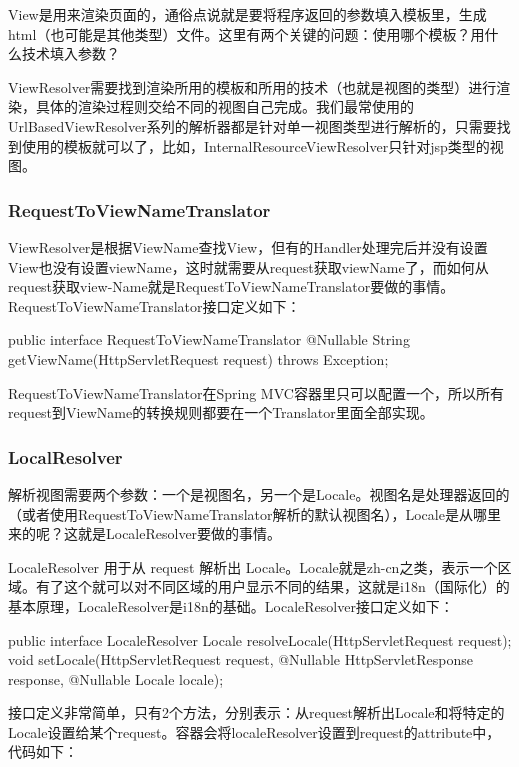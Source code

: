 View是用来渲染页面的，通俗点说就是要将程序返回的参数填入模板里，生成html（也可能是其他类型）文件。这里有两个关键的问题：使用哪个模板？用什么技术填入参数？

ViewResolver需要找到渲染所用的模板和所用的技术（也就是视图的类型）进行渲染，具体的渲染过程则交给不同的视图自己完成。我们最常使用的UrlBasedViewResolver系列的解析器都是针对单一视图类型进行解析的，只需要找到使用的模板就可以了，比如，InternalResourceViewResolver只针对jsp类型的视图。

\subsubsection*{RequestToViewNameTranslator}

ViewResolver是根据ViewName查找View，但有的Handler处理完后并没有设置View也没有设置viewName，这时就需要从request获取viewName了，而如何从request获取view-Name就是RequestToViewNameTranslator要做的事情。RequestToViewNameTranslator接口定义如下：

\begin{Java}
public interface RequestToViewNameTranslator {
	@Nullable
	String getViewName(HttpServletRequest request) throws Exception;
}
\end{Java}

RequestToViewNameTranslator在Spring MVC容器里只可以配置一个，所以所有request到ViewName的转换规则都要在一个Translator里面全部实现。

\subsubsection*{LocalResolver}

解析视图需要两个参数：一个是视图名，另一个是Locale。视图名是处理器返回的（或者使用RequestToViewNameTranslator解析的默认视图名），Locale是从哪里来的呢？这就是LocaleResolver要做的事情。

LocaleResolver 用于从 request 解析出 Locale。Locale就是zh-cn之类，表示一个区域。有了这个就可以对不同区域的用户显示不同的结果，这就是i18n（国际化）的基本原理，LocaleResolver是i18n的基础。LocaleResolver接口定义如下：

\begin{Java}
public interface LocaleResolver {
    Locale resolveLocale(HttpServletRequest request);
    void setLocale(HttpServletRequest request, @Nullable HttpServletResponse response, @Nullable Locale locale);
}
\end{Java}

接口定义非常简单，只有2个方法，分别表示：从request解析出Locale和将特定的Locale设置给某个request。容器会将localeResolver设置到request的attribute中，代码如下：

